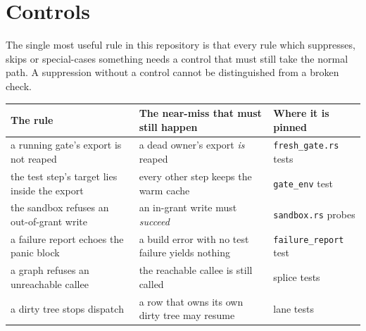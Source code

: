 \begin{center}
\end{center}

\section{Controls}

The single most useful rule in this repository is that every rule which suppresses, skips or
special-cases something needs a control that must still take the normal path. A suppression
without a control cannot be distinguished from a broken check.

\begin{longtable}{@{}p{}p{}p{}@{}}
\toprule
\textbf{The rule} & \textbf{The near-miss that must still happen} & \textbf{Where it is pinned} \\
\midrule
\endhead
a running gate's export is not reaped & a dead owner's export \emph{is} reaped &
\texttt{fresh\_gate.rs} tests \\
the test step's target lies inside the export & every other step keeps the warm cache &
\texttt{gate\_env} test \\
the sandbox refuses an out-of-grant write & an in-grant write must \emph{succeed} &
\texttt{sandbox.rs} probes \\
a failure report echoes the panic block & a build error with no test failure yields nothing &
\texttt{failure\_report} test \\
a graph refuses an unreachable callee & the reachable callee is still called & splice tests \\
a dirty tree stops dispatch & a row that owns its own dirty tree may resume & lane tests \\
\bottomrule
\end{longtable}

